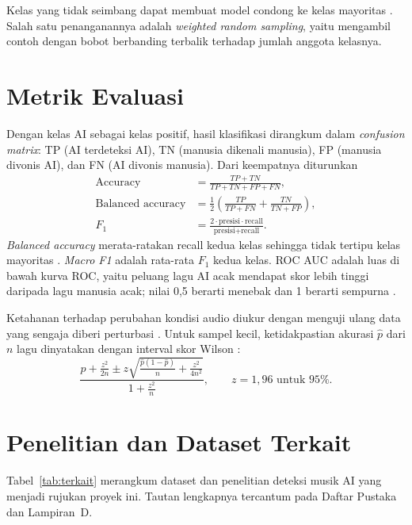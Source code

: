 Kelas yang tidak seimbang dapat membuat model condong ke kelas mayoritas \cite{he2009learning}. Salah satu penanganannya adalah \textit{weighted random sampling}, yaitu mengambil contoh dengan bobot berbanding terbalik terhadap jumlah anggota kelasnya.

\section{Metrik Evaluasi}
Dengan kelas AI sebagai kelas positif, hasil klasifikasi dirangkum dalam \textit{confusion matrix}: TP (AI terdeteksi AI), TN (manusia dikenali manusia), FP (manusia divonis AI), dan FN (AI divonis manusia). Dari keempatnya diturunkan
\begin{align}
\text{Accuracy} &= \frac{TP + TN}{TP + TN + FP + FN},\label{eq:acc}\\
\text{Balanced accuracy} &= \frac{1}{2}\left(\frac{TP}{TP+FN} + \frac{TN}{TN+FP}\right),\label{eq:balacc}\\
F_1 &= \frac{2 \cdot \text{presisi} \cdot \text{recall}}{\text{presisi} + \text{recall}}.\label{eq:f1}
\end{align}
\textit{Balanced accuracy} merata-ratakan recall kedua kelas sehingga tidak tertipu kelas mayoritas \cite{brodersen2010balanced}. \textit{Macro F1} adalah rata-rata $F_1$ kedua kelas. ROC AUC adalah luas di bawah kurva ROC, yaitu peluang lagu AI acak mendapat skor lebih tinggi daripada lagu manusia acak; nilai 0,5 berarti menebak dan 1 berarti sempurna \cite{fawcett2006introduction}.

Ketahanan terhadap perubahan kondisi audio diukur dengan menguji ulang data yang sengaja diberi perturbasi \cite{hendrycks2019benchmarking}. Untuk sampel kecil, ketidakpastian akurasi $\hat{p}$ dari $n$ lagu dinyatakan dengan interval skor Wilson \cite{wilson1927probable}:
\begin{equation}
\frac{\hat{p} + \frac{z^2}{2n} \pm z\sqrt{\frac{\hat{p}(1-\hat{p})}{n} + \frac{z^2}{4n^2}}}{1 + \frac{z^2}{n}},\qquad z = 1{,}96 \text{ untuk 95\%}.
\label{eq:wilson}
\end{equation}

\section{Penelitian dan Dataset Terkait}\label{sec:terkait}
Tabel~\ref{tab:terkait} merangkum dataset dan penelitian deteksi musik AI yang menjadi rujukan proyek ini. Tautan lengkapnya tercantum pada Daftar Pustaka dan Lampiran~D.


